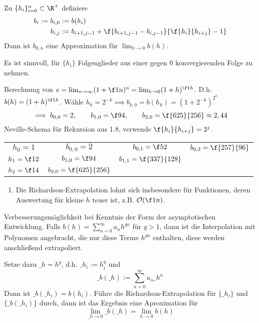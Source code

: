 \documentclass[11pt]{scrbook}
\begin{document}
\begin{df} \label{1.8}
	Zu $\{h_i\}_{i=0}^n \subset \R^+$ definiere
	\begin{align*}
		b_i := b_{i,0} &:= b(h_i)\\
		b_{i,j} &:= b_{i+1,j-1} + \f {b_{i+1,j-1}-b_{i,j-1}}{\f {h_i}{h_{i+j}}-1}
	\end{align*}
	Dann ist $b_{0,n}$ eine Approximation für $\lim_{h\to 0} b(h)$.
	\begin{note}
		Es ist sinnvoll, für $\{h_i\}$ Folgenglieder aus einer gegen 0 konvergierenden Folge zu nehmen.
	\end{note}
\end{df}

\begin{ex*}
	Berechnung von $e=\lim_{n\to \infty} (1 +\f 1n)^n = \lim_{h\to 0} (1+h)^{\f 1h}$.
	D.h. $b(h)=(1+h)^{\f 1h}$.
	Wähle $h_k=2^{-k} \implies b_{k,0}=b(h_k) = (1+2^{-k})^{2^k}$
	\[
		\implies b_{0,0} = 2, \qquad b_{1,0} = \f 94, \qquad b_{2,0} = \f {625}{256} \approx 2,44
	\]
	Neville-Schema für Rekursion aus 1.8, verwende $\f {h_i}{h_{i+j}} = 2^j$.
	\begin{table}[!ht]
		\centering
		\begin{tabular}{c|ccc}
			$h_0=1$ & $b_{0,0}=2$  & $b_{0,1}=\f 52$ & $b_{0,2}=\f {257}{96}$\\
			$h_1=\f12$ & $b_{1,0}=\f 94$  & $b_{1,1}=\f {337}{128}$ & \\
			$h_2=\f14$ & $b_{2,0}=\f {625}{256}$  \\
		\end{tabular}
	\end{table}
\end{ex*}

\begin{note}
	\begin{enumerate}
		\item 
			Die Richardson-Extrapolation lohnt sich insbesondere für Funktionen, deren Auswertung für kleine $h$ teuer ist, z.B. $\mathcal O(\f 1n)$.
	\end{enumerate}
\end{note}

\begin{note}
	Verbesserungsmöglichkeit bei Kenntnis der Form der asymptotischen Entwicklung.
	Falls $b(h) = \sum_{n=0}^\infty a_nh^{qn}$ für $q>1$, dann ist die Interpolation mit Polynomen angebracht, die nur diese Terme $h^{qn}$ enthalten, diese werden anschließend extrapoliert.

	Setze dazu $\_h = h^q$, d.h. $\_{h_{i}}:= h_i^q$ und
	\[
		\_b(\_h) := \sum_{n=0}^\infty a_n\_h^n
	\]
	Dann ist $\_b(\_h_i) = b(h_i)$.
	Führe die Richardson-Extrapolation für $\{\_h_i\}$ und $\{\_b(\_h_i)\}$ durch, dann ist das Ergebnis eine Aproximation für
	\[
		\lim_{\_h\to 0}\_b(\_h) = \lim_{h\to 0}b(h)
	\]
\end{note}
\end{document}

